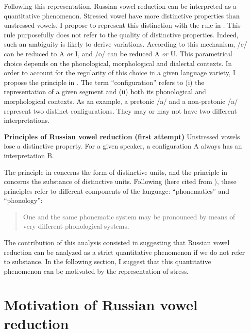 \documentclass[output=paper,
modfonts,
newtxmath,
hidelinks,
]{langscibook}
\begin{document}
\noindent Following this representation, Russian vowel reduction can be interpreted as a quantitative phenomenon. Stressed vowel have more distinctive properties than unstressed vowels. I propose to represent this distinction with the rule in . This rule purposefully does not refer to the quality of distinctive properties. Indeed, such an ambiguity is likely to derive variations. According to this mechanism, /e/ can be reduced to {\textbar}A{\textbar} \textit{or} {\textbar}I{\textbar}, and /o/ can be reduced {\textbar}A{\textbar} \textit{or} {\textbar}U{\textbar}. This parametrical choice depends on the phonological, morphological and dialectal contexts. In order to account for the regularity of this choice in a given language variety, I propose the principle in . The term “configuration” refers to (i) the representation of a given segment and (ii) both its phonological and morphological contexts. As an example, a pretonic /a/ and a non-pretonic /a/ represent two distinct configurations. They may or may not have two different interpretations.

\ea \textbf{Principles of Russian vowel reduction (first attempt)}\label{21}
\ea Unstressed vowels lose a distinctive property.\label{21a}
\ex For a given speaker, a configuration A always has an interpretation B.\label{21b}
\z\z

\noindent The principle in  concerns the form of distinctive units, and the principle in  concerns the substance of distinctive units. Following \citet{Hjelmslev1936} (here cited from \citealt{Hjelmslev1973}), these principles refer to different components of the language: “phonematics” and “phonology”:

\begin{quotation}
One and the same phonematic system may be pronounced by means of very different phonological systems. \citep[159]{Hjelmslev1973}
\end{quotation}

The contribution of this analysis consisted in suggesting that Russian vowel reduction can be analyzed as a strict quantitative phenomenon if we do not refer to substance. In the following section, I suggest that this quantitative phenomenon can be motivated by the representation of stress.

\section{Motivation of Russian vowel reduction}\label{s4}
\end{document}
